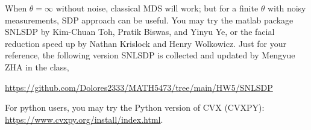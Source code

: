 \documentclass[11pt]{article}
\def\diag{{\mathrm{diag}}}
\begin{document}
When $\theta=\infty$ without noise, classical MDS will work; but for a finite $\theta$ with noisy measurements, SDP approach can be useful. You may try the matlab package SNLSDP by Kim-Chuan Toh, Pratik Biswas, and Yinyu Ye, or the facial reduction speed up by Nathan Krislock and Henry Wolkowicz. Just for your reference, the following version SNLSDP is collected and updated by Mengyue ZHA in the class, 

\url{https://github.com/Dolores2333/MATH5473/tree/main/HW5/SNLSDP}

For python users, you may try the Python version of CVX (CVXPY): \url{https://www.cvxpy.org/install/index.html}. 


%
%
%
%
%
\end{document}
